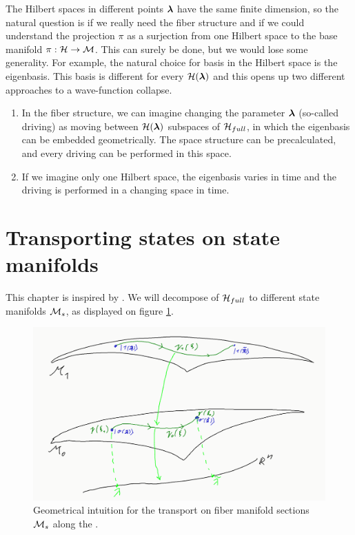 The Hilbert spaces in different points ${\bm\lambda}$ have the same finite dimension, so the natural question is if we really need the fiber structure and if we could understand the projection $\pi$ as a surjection from one Hilbert space to the base manifold $\pi: \mathcal{H}\rightarrow \mathcal{M}$. This can surely be done, but we would lose some generality. For example, the natural choice for basis in the Hilbert space is the eigenbasis. This basis is different for every $\mathcal{H}({\bm\lambda})$ and this opens up two different approaches to a wave-function collapse.
\begin{enumerate}
    \item In the fiber structure, we can imagine changing the parameter ${\bm\lambda}$ (so-called driving) as moving between $\mathcal{H}({\bm\lambda})$ subspaces of $\mathcal{H}_{full}$, in which the eigenbasis can be embedded geometrically. The space structure can be precalculated, and every driving can be performed in this space.
    \item If we imagine only one Hilbert space, the eigenbasis varies in time and the driving is performed in a changing space in time.
\end{enumerate}








\section{Transporting states on state manifolds}
This chapter is inspired by \citet{berry1984}. We will decompose of $\mathcal{H}_{full}$ to different state manifolds $\mathcal{M}_s$, as displayed on figure \ref{fig:manifoldCutIntuition}.

\begin{figure}[h]
    \centering
    \includegraphics[width=\textwidth]{../img/manifoldCutIntuition.png}
\caption{Geometrical intuition for the  transport on fiber manifold sections $\mathcal{M}_s$ along the .}
    \label{fig:manifoldCutIntuition}
\end{figure}

